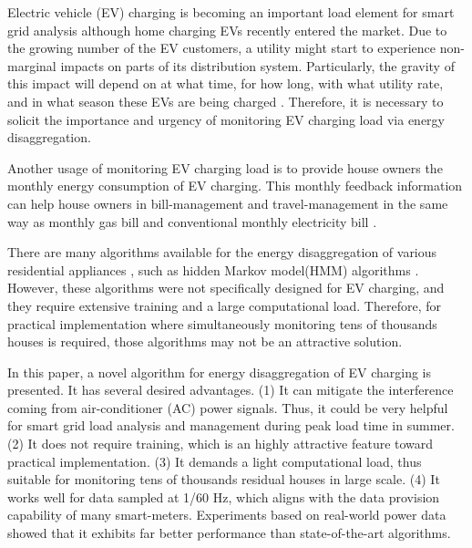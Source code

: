 \documentclass[conference]{IEEEtran}
\begin{document}
Electric vehicle (EV) charging is becoming an important load element for smart grid analysis \cite{clement2010impact,PecanReportEV,luo2013} although home charging EVs recently entered the market. Due to the growing number of the EV customers, a utility might start to experience non-marginal impacts on parts of its distribution system.  Particularly, the gravity of this impact will depend on at what time, for how long, with what utility rate, and in what season these EVs are being charged \cite{PecanReportEVData}. Therefore, it is necessary to solicit the importance and urgency of monitoring EV charging load via energy disaggregation.

Another usage of monitoring EV charging load is to provide house owners the monthly energy consumption of EV charging. This monthly feedback information can help house owners in bill-management and travel-management in the same way as monthly gas bill and conventional monthly electricity bill \cite{hayes1981reduction}.


There are many algorithms available for the energy disaggregation of various residential appliances \cite{hart1992nonintrusive,NN2006,zeifman2011nonintrusive,zoha2012non,parson2012non,kolter2012approximate,kolter2010energy,johnson2012bayesian,Du2013}, such as hidden Markov model(HMM) algorithms \cite{parson2012non,kolter2012approximate,johnson2012bayesian}. However, these algorithms were not specifically designed for EV charging, and they require extensive training and a large computational load. Therefore, for practical implementation where simultaneously monitoring tens of thousands houses is required, those algorithms may not be an attractive solution.





In this paper, a novel algorithm for energy disaggregation of EV charging is presented. It has several desired advantages. (1) It can mitigate the interference coming from air-conditioner (AC) power signals. Thus, it could be very helpful for smart grid load analysis and management during  peak load time in summer. (2) It does not require training, which is an highly attractive feature toward practical implementation. (3) It demands a light computational load, thus suitable for monitoring tens of thousands residual houses in large scale. (4) It works well for data sampled at 1/60 Hz, which aligns with the data provision capability of many smart-meters. Experiments based on real-world power data showed that it exhibits far better performance than state-of-the-art algorithms.
\end{document}

